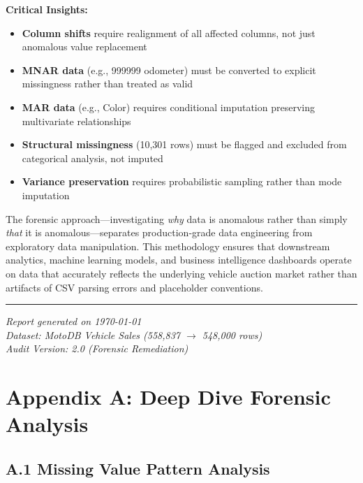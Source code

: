 \documentclass[12pt,a4paper]{article}
\begin{document}
\textbf{Critical Insights:}
\begin{itemize}
    \item \textbf{Column shifts} require realignment of all affected columns, not just anomalous value replacement
    \item \textbf{MNAR data} (e.g., 999999 odometer) must be converted to explicit missingness rather than treated as valid
    \item \textbf{MAR data} (e.g., Color) requires conditional imputation preserving multivariate relationships
    \item \textbf{Structural missingness} (10,301 rows) must be flagged and excluded from categorical analysis, not imputed
    \item \textbf{Variance preservation} requires probabilistic sampling rather than mode imputation
\end{itemize}

The forensic approach---investigating \textit{why} data is anomalous rather than simply \textit{that} it is anomalous---separates production-grade data engineering from exploratory data manipulation. This methodology ensures that downstream analytics, machine learning models, and business intelligence dashboards operate on data that accurately reflects the underlying vehicle auction market rather than artifacts of CSV parsing errors and placeholder conventions.

\vspace{1cm}
\noindent\rule{\textwidth}{0.4pt}
\begin{center}
\textit{Report generated on \today\\
Dataset: MotoDB Vehicle Sales (558,837 $\rightarrow$ 548,000 rows)\\
Audit Version: 2.0 (Forensic Remediation)}
\end{center}



\appendix
\section{Appendix A: Deep Dive Forensic Analysis}

\subsection{A.1 Missing Value Pattern Analysis}
\end{document}
